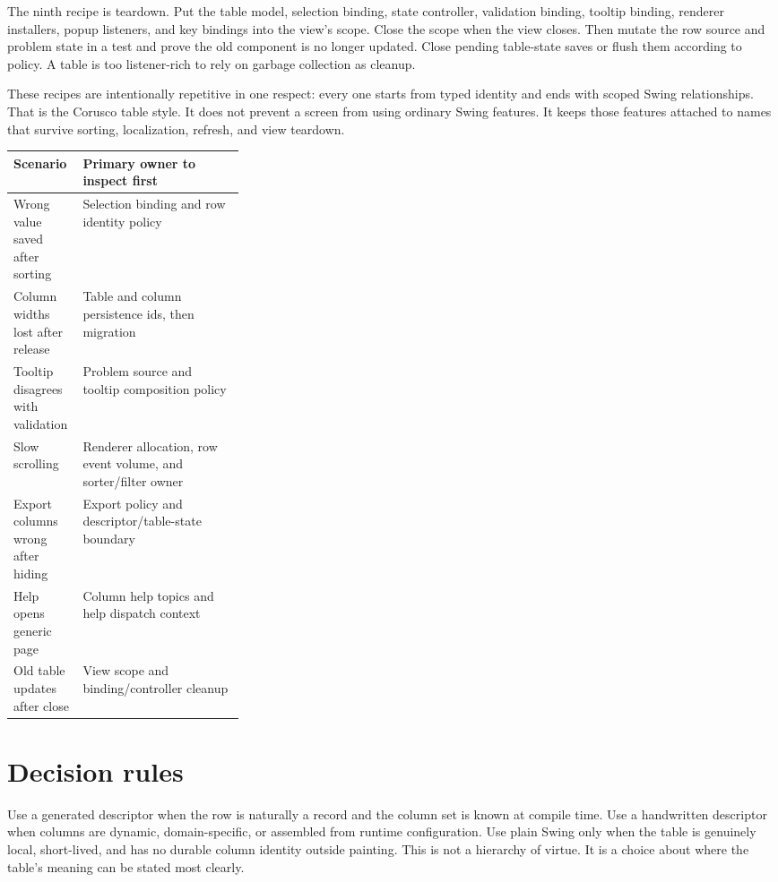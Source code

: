 The ninth recipe is teardown. Put the table model, selection binding, state
controller, validation binding, tooltip binding, renderer installers, popup
listeners, and key bindings into the view's scope. Close the scope when the
view closes. Then mutate the row source and problem state in a test and prove
the old component is no longer updated. Close pending table-state saves or
flush them according to policy. A table is too listener-rich to rely on
garbage collection as cleanup.

These recipes are intentionally repetitive in one respect: every one starts
from typed identity and ends with scoped Swing relationships. That is the
Corusco table style. It does not prevent a screen from using ordinary Swing
features. It keeps those features attached to names that survive sorting,
localization, refresh, and view teardown.

\begin{tabularx}{0.96\linewidth}{@{}p{0.30\linewidth}X@{}}
\toprule
Scenario & Primary owner to inspect first\\
\midrule
Wrong value saved after sorting & Selection binding and row identity policy\\
Column widths lost after release & Table and column persistence ids, then migration\\
Tooltip disagrees with validation & Problem source and tooltip composition policy\\
Slow scrolling & Renderer allocation, row event volume, and sorter/filter owner\\
Export columns wrong after hiding & Export policy and descriptor/table-state boundary\\
Help opens generic page & Column help topics and help dispatch context\\
Old table updates after close & View scope and binding/controller cleanup\\
\bottomrule
\end{tabularx}

\section{Decision rules}

Use a generated  descriptor when the row is naturally a record
and the column set is known at compile time. Use a handwritten descriptor when
columns are dynamic, domain-specific, or assembled from runtime configuration.
Use plain Swing only when the table is genuinely local, short-lived, and has
no durable column identity outside painting. This is not a hierarchy of virtue.
It is a choice about where the table's meaning can be stated most clearly.

